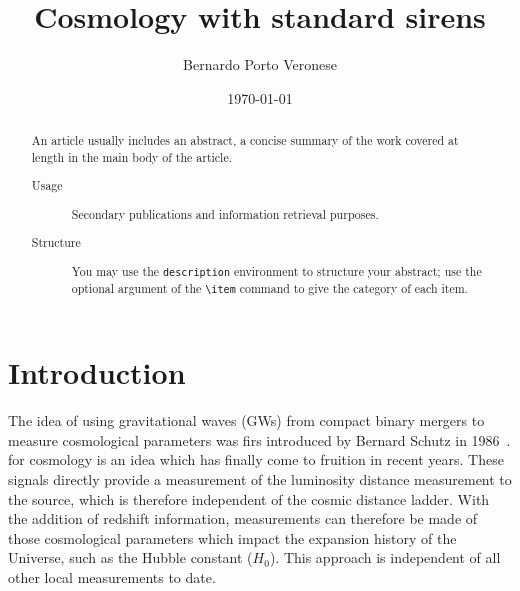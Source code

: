 \documentclass[%
 reprint,
 amsmath,amssymb,
 aps,
]{revtex4-2}
\begin{document}

\title{Cosmology with standard sirens}

\author{Bernardo Porto Veronese}
%


\date{\today}%

\begin{abstract}
An article usually includes an abstract, a concise summary of the work
covered at length in the main body of the article. 
\begin{description}
\item[Usage]
Secondary publications and information retrieval purposes.
\item[Structure]
You may use the \texttt{description} environment to structure your abstract;
use the optional argument of the \verb+\item+ command to give the category of each item. 
\end{description}
\end{abstract}

\maketitle


\section{\label{sec:introduction}Introduction}
The idea of using gravitational waves (GWs) from compact
binary mergers to measure cosmological parameters was firs introduced by Bernard Schutz in 1986~\cite{Schutz:1986gp}. for cosmology is an idea
which has finally come to fruition in recent years. These
signals directly provide a measurement of the luminosity
distance measurement to the source, which is therefore
independent of the cosmic distance ladder. With the addition of redshift information, measurements can therefore be made of those cosmological parameters which
impact the expansion history of the Universe, such as
the Hubble constant ($H_0$). This approach is independent of all other local measurements to date.
\end{document}

